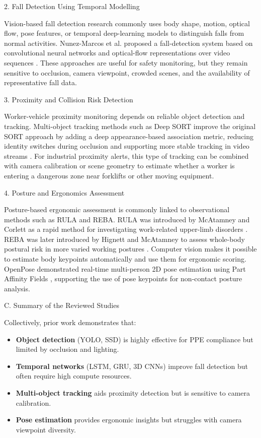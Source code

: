 2. Fall Detection Using Temporal Modelling

Vision-based fall detection research commonly uses body shape, motion, optical flow, pose features, or temporal deep-learning models to distinguish falls from normal activities. Nunez-Marcos et al. proposed a fall-detection system based on convolutional neural networks and optical-flow representations over video sequences \cite{nunez2017fall}. These approaches are useful for safety monitoring, but they remain sensitive to occlusion, camera viewpoint, crowded scenes, and the availability of representative fall data.

3. Proximity and Collision Risk Detection

Worker-vehicle proximity monitoring depends on reliable object detection and tracking. Multi-object tracking methods such as Deep SORT improve the original SORT approach by adding a deep appearance-based association metric, reducing identity switches during occlusion and supporting more stable tracking in video streams \cite{wojke2017deepsort}. For industrial proximity alerts, this type of tracking can be combined with camera calibration or scene geometry to estimate whether a worker is entering a dangerous zone near forklifts or other moving equipment.

4. Posture and Ergonomics Assessment

Posture-based ergonomic assessment is commonly linked to observational methods such as RULA and REBA. RULA was introduced by McAtamney and Corlett as a rapid method for investigating work-related upper-limb disorders \cite{mcatamney1993rula}. REBA was later introduced by Hignett and McAtamney to assess whole-body postural risk in more varied working postures \cite{hignett2000reba}. Computer vision makes it possible to estimate body keypoints automatically and use them for ergonomic scoring. OpenPose demonstrated real-time multi-person 2D pose estimation using Part Affinity Fields \cite{cao2017openpose}, supporting the use of pose keypoints for non-contact posture analysis.

C. Summary of the Reviewed Studies

Collectively, prior work demonstrates that:

\begin{itemize}
\item \textbf{Object detection} (YOLO, SSD) is highly effective for PPE compliance but limited by occlusion and lighting.
\item \textbf{Temporal networks} (LSTM, GRU, 3D CNNs) improve fall detection but often require high compute resources.
\item \textbf{Multi-object tracking} aids proximity detection but is sensitive to camera calibration.
\item \textbf{Pose estimation} provides ergonomic insights but struggles with camera viewpoint diversity.
\end{itemize}

